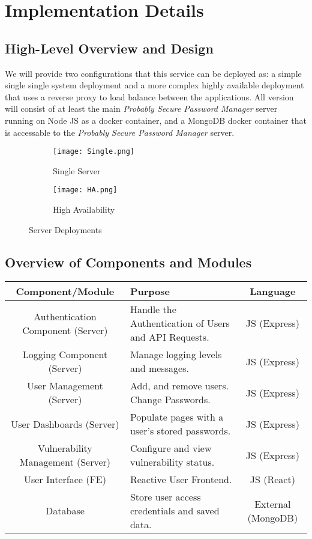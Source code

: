 
\section{Implementation Details}
\subsection{High-Level Overview and Design}
We will provide two configurations that this service can be deployed as: a simple single single system deployment and a more complex highly available deployment that uses a reverse proxy to load balance between the applications. All version will consist of at least the main \textit{Probably Secure Password Manager} server running on Node JS as a docker container, and a MongoDB docker container that is accessable to the \textit{Probably Secure Password Manager} server.

\begin{figure}[h]
  \centering
  \begin{subfigure}{0.45\textwidth}
    \centering
    \texttt{[image: Single.png]}
    \caption{Single Server}
  \end{subfigure}
  \hfill
  \begin{subfigure}{0.45\textwidth}
    \centering
    \texttt{[image: HA.png]}
    \caption{High Availability}
  \end{subfigure}
  \caption{Server Deployments}
\end{figure}



\subsection{Overview of Components and Modules}

\begin{tabular}{|c|p{6cm}|c|}
    \hline
    \textbf{Component/Module}& \textbf{Purpose} & \textbf{Language}\\
    \hline
    Authentication Component (Server) & Handle the Authentication of Users and API Requests. & JS (Express)\\ 
    \hline
    Logging Component (Server) & Manage logging levels and messages. & JS (Express)\\
    \hline
    User Management (Server) & Add, and remove users. Change Passwords. & JS (Express)\\
    \hline
    User Dashboards (Server) & Populate pages with a user's stored passwords. & JS (Express)\\
    \hline
    Vulnerability Management (Server) & Configure and view vulnerability status. & JS (Express)\\
    \hline
    User Interface (FE) & Reactive User Frontend. & JS (React)\\
    \hline
    Database & Store user access credentials and saved data. & External (MongoDB)\\
    \hline
\end{tabular}

